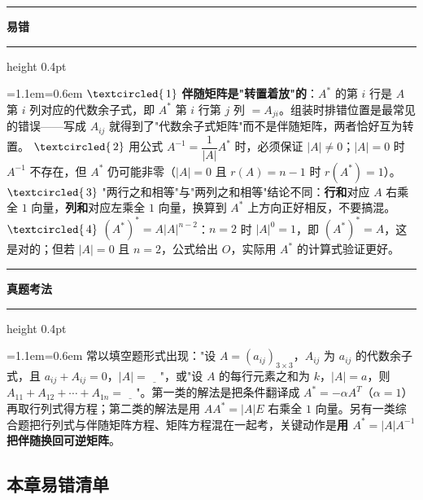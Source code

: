 \documentclass[11pt,openany,UTF8]{ctexbook}
\newcommand{\circled}[1]{\textcircled{\scriptsize\,#1}}
\newcommand{\callouthead}[2]{%
  \par\addvspace{7pt}\noindent
  {\color{#1}\rule[-0.15em]{3pt}{1.05em}}\hspace{0.5em}%
  {\bfseries\color{#1}#2}\par\nobreak\vspace{-0.35em}%
  {\color{rulesep}\hrule height 0.4pt}\nobreak\vspace{0.45em}%
  \begingroup\small\setlength{\parindent}{0pt}%
  \leftskip=1.1em\rightskip=0.6em\noindent\ignorespaces}
\newcommand{\calloutend}{\par\endgroup\addvspace{7pt}}
\newenvironment{callwarn}[1]{\callouthead{warnbar}{#1}}{\calloutend}
\newenvironment{callexam}[1]{\callouthead{exambar}{#1}}{\calloutend}
\begin{document}
\begin{callwarn}{易错}
$\circled{1}$ \textbf{伴随矩阵是"转置着放"的}：$A^*$ 的第 $i$ 行是 $A$ 第 $i$ 列对应的代数余子式，即 $A^*$ 第 $i$ 行第 $j$ 列 $=A_{ji}$。组装时排错位置是最常见的错误——写成 $A_{ij}$ 就得到了"代数余子式矩阵"而不是伴随矩阵，两者恰好互为转置。 $\circled{2}$ 用公式 $A^{-1}=\dfrac{1}{\vert A\vert}A^*$ 时，必须保证 $\vert A\vert\ne0$；$\vert A\vert=0$ 时 $A^{-1}$ 不存在，但 $A^*$ 仍可能非零（$\vert A\vert=0$ 且 $r(A)=n-1$ 时 $r(A^*)=1$）。 $\circled{3}$ "两行之和相等"与"两列之和相等"结论不同：\textbf{行和}对应 $A$ 右乘全 $1$ 向量，\textbf{列和}对应左乘全 $1$ 向量，换算到 $A^*$ 上方向正好相反，不要搞混。 $\circled{4}$ $(A^*)^*=A\vert A\vert^{n-2}$：$n=2$ 时 $\vert A\vert^{0}=1$，即 $(A^*)^*=A$，这是对的；但若 $\vert A\vert=0$ 且 $n=2$，公式给出 $O$，实际用 $A^*$ 的计算式验证更好。

\end{callwarn}

\begin{callexam}{真题考法}
常以填空题形式出现："设 $A=(a_{ij})_{3\times3}$，$A_{ij}$ 为 $a_{ij}$ 的代数余子式，且 $a_{ij}+A_{ij}=0$，$\vert A\vert=\underline{\quad}$"，或"设 $A$ 的每行元素之和为 $k$，$\vert A\vert=a$，则 $A_{11}+A_{12}+\cdots+A_{1n}=\underline{\quad}$"。第一类的解法是把条件翻译成 $A^*=-\alpha A^T$（$\alpha=1$）再取行列式得方程；第二类的解法是用 $AA^*=\vert A\vert E$ 右乘全 $1$ 向量。另有一类综合题把行列式与伴随矩阵方程、矩阵方程混在一起考，关键动作是\textbf{用 $A^*=\vert A\vert A^{-1}$ 把伴随换回可逆矩阵}。

\end{callexam}

\subsection*{本章易错清单}
\end{document}
